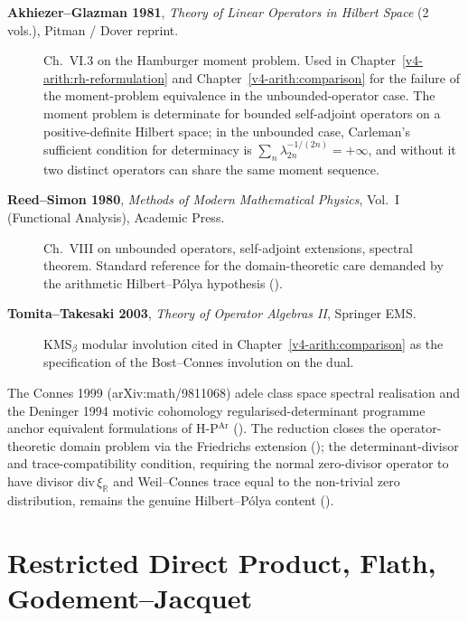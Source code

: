 \begin{description}
\item[\textbf{Akhiezer--Glazman 1981}, \emph{Theory of Linear
Operators in Hilbert Space} (2 vols.), Pitman / Dover reprint.]
Ch.~VI.3 on the Hamburger moment problem. Used in
Chapter~\ref{v4-arith:rh-reformulation}
 and
Chapter~\ref{v4-arith:comparison} for the failure of the moment-problem
equivalence in the unbounded-operator case. The moment problem is
determinate for bounded self-adjoint operators on a
positive-definite Hilbert space; in the unbounded case, Carleman's
sufficient condition for determinacy is
\(\sum_{n}\lambda_{2n}^{-1/(2n)}=+\infty\), and without it two
distinct operators can share the same moment sequence.
\item[\textbf{Reed--Simon 1980}, \emph{Methods of Modern
Mathematical Physics}, Vol.~I (Functional Analysis), Academic Press.]
Ch.~VIII on unbounded operators, self-adjoint extensions,
spectral theorem. Standard reference for the domain-theoretic
care demanded by the arithmetic Hilbert--P\'olya hypothesis
().
\item[\textbf{Tomita--Takesaki 2003}, \emph{Theory of Operator
Algebras II}, Springer EMS.] KMS\({}_{\beta}\) modular involution
cited in Chapter~\ref{v4-arith:comparison}
 as the specification of the
Bost--Connes involution on the dual.
\end{description}

The Connes 1999 (arXiv:math/9811068) adele class space spectral
realisation and the Deninger 1994 motivic cohomology
regularised-determinant programme anchor equivalent formulations of
H-P\(^{\mathrm{Ar}}\)
(). The reduction
closes the operator-theoretic domain problem via the Friedrichs
extension (); the
determinant-divisor and trace-compatibility condition, requiring the
normal zero-divisor operator to have divisor \(\mathrm{div}\,\xi_{\mathbb R}\)
and Weil--Connes trace equal to the non-trivial zero distribution,
remains the genuine Hilbert--P\'olya content
().

\section{Restricted Direct Product, Flath, Godement--Jacquet}
\label{v4-arith:app:A:restricted-tensor}

